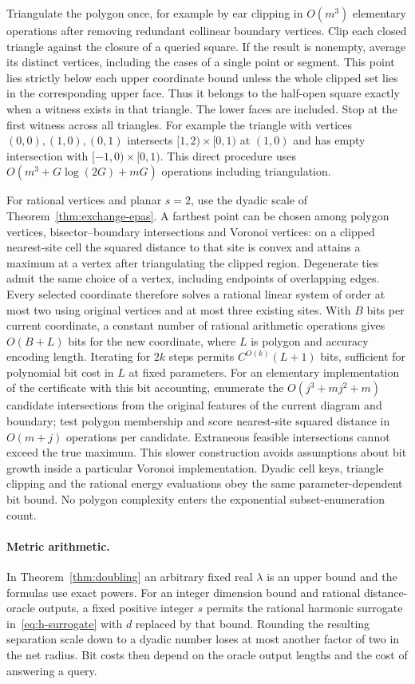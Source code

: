 \documentclass[a4paper,12pt]{article}
\numberwithin{equation}{section}
\begin{document}
Triangulate the polygon once, for example by ear clipping in $O(m^3)$
elementary operations after removing redundant collinear boundary vertices.
Clip each closed triangle against the closure of a queried square. If the result
is nonempty, average its distinct vertices, including the cases of a single
point or segment. This point lies strictly below each upper coordinate bound
unless the whole clipped set lies in the corresponding upper face. Thus it
belongs to the half-open square exactly when a witness exists in that triangle.
The lower faces are included. Stop at the first witness across all triangles.
For example the triangle with vertices $(0,0),(1,0),(0,1)$ intersects
$[1,2)\times[0,1)$ at $(1,0)$ and has empty intersection with
$[-1,0)\times[0,1)$. This direct procedure uses
$O(m^3+G\log(2G)+mG)$ operations including triangulation.

For rational vertices and planar $s=2$, use the dyadic scale of
Theorem~\ref{thm:exchange-epas}. A farthest point can be chosen among polygon
vertices, bisector--boundary intersections and Voronoi vertices: on a clipped
nearest-site cell the squared distance to that site is convex and attains a
maximum at a vertex after triangulating the clipped region. Degenerate ties
admit the same choice of a vertex, including endpoints of overlapping edges.
Every selected coordinate therefore solves a rational linear system of order
at most two using original vertices and at most three existing sites. With
$B$ bits per current coordinate, a constant number of rational arithmetic
operations gives $O(B+L)$ bits for the new coordinate, where $L$ is polygon
and accuracy encoding length. Iterating for $2k$ steps permits
$C^{O(k)}(L+1)$ bits, sufficient for polynomial bit cost in $L$ at fixed
parameters. For an elementary implementation of the certificate with this
bit accounting, enumerate the $O(j^3+mj^2+m)$ candidate intersections from
the original features of the current diagram and boundary; test polygon
membership and score nearest-site squared distance in $O(m+j)$ operations
per candidate. Extraneous feasible intersections cannot exceed the true
maximum. This slower construction avoids assumptions about bit growth inside
a particular Voronoi implementation. Dyadic cell keys, triangle clipping and
the rational energy evaluations obey the same parameter-dependent bit bound.
No polygon complexity enters the exponential subset-enumeration count.

\paragraph{Metric arithmetic.}
In Theorem~\ref{thm:doubling} an arbitrary fixed real $\lambda$ is an upper
bound and the formulas use exact powers. For an integer dimension bound and
rational distance-oracle outputs, a fixed positive integer $s$ permits the
rational harmonic surrogate in~\eqref{eq:h-surrogate} with $d$ replaced by
that bound. Rounding the resulting separation scale down to a dyadic number
loses at most another factor of two in the net radius. Bit costs then depend
on the oracle output lengths and the cost of answering a query.
\end{document}
